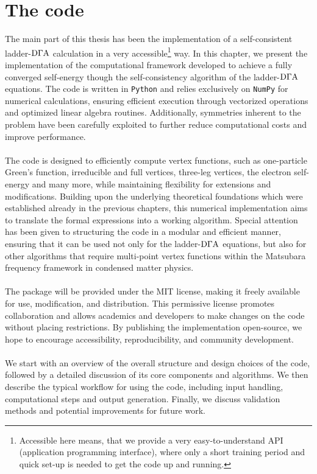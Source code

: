 \documentclass[../../main.tex]{subfiles}
\begin{document}
\chapter{The code}

The main part of this thesis has been the implementation of a self-consistent ladder-$\text{D}\Gamma\text{A}$ calculation in a very accessible\footnote{Accessible here means, that we provide a very easy-to-understand API (application programming interface), where only a short training period and quick set-up is needed to get the code up and running.} way. In this chapter, we present the implementation of the computational framework developed to achieve a fully converged self-energy though the self-consistency algorithm of the ladder-$\text{D}\Gamma\text{A}$ equations. The code is written in \texttt{Python} and relies exclusively on \texttt{NumPy} for numerical calculations, ensuring efficient execution through vectorized operations and optimized linear algebra routines. Additionally, symmetries inherent to the problem have been carefully exploited to further reduce computational costs and improve performance. 
\\\\
The code is designed to efficiently compute vertex functions, such as one-particle Green's function, irreducible and full vertices, three-leg vertices, the electron self-energy and many more, while maintaining flexibility for extensions and modifications. Building upon the underlying theoretical foundations which were established already in the previous chapters, this numerical implementation aims to translate the formal expressions into a working algorithm. Special attention has been given to structuring the code in a modular and efficient manner, ensuring that it can be used not only for the ladder-$\text{D}\Gamma\text{A}$ equations, but also for other algorithms that require multi-point vertex functions within the Matsubara frequency framework in condensed matter physics.
\\\\
The package will be provided under the MIT license, making it freely available for use, modification, and distribution. This permissive license promotes collaboration and allows academics and developers to make changes on the code without placing restrictions. By publishing the implementation open-source, we hope to encourage accessibility, reproducibility, and community development.
\\\\
We start with an overview of the overall structure and design choices of the code, followed by a detailed discussion of its core components and algorithms. We then describe the typical workflow for using the code, including input handling, computational steps and output generation. Finally, we discuss validation methods and potential improvements for future work.
\end{document}
